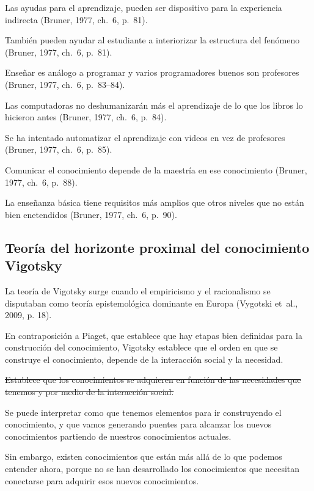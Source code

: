 \documentclass[
  12,
]{scrartcl}
\begin{document}
Las ayudas para el aprendizaje, pueden ser dispositivo para la
experiencia indirecta (Bruner, 1977, ch.~6, p.~81).

También pueden ayudar al estudiante a interiorizar la estructura del
fenómeno (Bruner, 1977, ch.~6, p.~81).

Enseñar es análogo a programar y varios programadores buenos son
profesores (Bruner, 1977, ch.~6, p.~83--84).

Las computadoras no deshumanizarán más el aprendizaje de lo que los
libros lo hicieron antes (Bruner, 1977, ch.~6, p.~84).

Se ha intentado automatizar el aprendizaje con videos en vez de
profesores (Bruner, 1977, ch.~6, p.~85).

Comunicar el conocimiento depende de la maestría en ese conocimiento
(Bruner, 1977, ch.~6, p.~88).

La enseñanza básica tiene requisitos más amplios que otros niveles que
no están bien enetendidos (Bruner, 1977, ch.~6, p.~90).

\hypertarget{teoruxeda-del-horizonte-proximal-del-conocimiento-vigotsky}{%
\subsection{Teoría del horizonte proximal del conocimiento
Vigotsky}\label{teoruxeda-del-horizonte-proximal-del-conocimiento-vigotsky}}

La teoría de Vigotsky surge cuando el empiricismo y el racionalismo se
disputaban como teoría epistemológica dominante en Europa (Vygotski
et~al., 2009, p. 18).

En contraposición a Piaget, que establece que hay etapas bien definidas
para la construcción del conocimiento, Vigotsky establece que el orden
en que se construye el conocimiento, depende de la interacción social y
la necesidad.

\sout{Establece que los conocimientos se adquieren en función de las
necesidades que tenemos y por medio de la interacción social.}

Se puede interpretar como que tenemos elementos para ir construyendo el
conocimiento, y que vamos generando puentes para alcanzar los nuevos
conocimientos partiendo de nuestros conocimientos actuales.

Sin embargo, existen conocimientos que están más allá de lo que podemos
entender ahora, porque no se han desarrollado los conocimientos que
necesitan conectarse para adquirir esos nuevos conocimientos.
\end{document}
